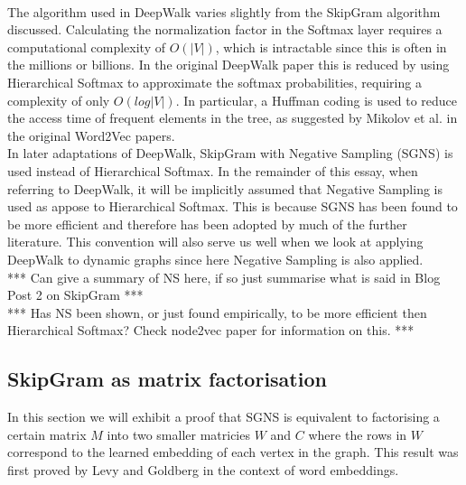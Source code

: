 \documentclass[a4paper]{article}
\begin{document}
\\
The algorithm used in DeepWalk varies slightly from the SkipGram algorithm
discussed. Calculating the normalization factor in the Softmax layer requires a
computational complexity of $O(|V|)$, which is intractable since this is often
in the millions or billions. In the original DeepWalk paper this is
reduced by using Hierarchical Softmax to approximate the softmax probabilities,
requiring a complexity of only $O(log|V|)$. In particular, a Huffman coding is
used to reduce the access time of frequent elements in the tree, as suggested by
Mikolov et al. in the original Word2Vec
papers.\cite{mikolov2013efficient,mikolov2013distributed}\\
In later adaptations of DeepWalk, SkipGram with Negative Sampling (SGNS) is used instead of
Hierarchical Softmax. In the remainder of this essay, when referring to DeepWalk, it will be
implicitly assumed that Negative Sampling is used as appose to Hierarchical
Softmax. This is because SGNS has been found to be more efficient
and therefore has been adopted by much of the further literature. This convention will also
serve us well when we look at applying DeepWalk to dynamic graphs since here
Negative Sampling is also applied.\\
*** Can give a summary of NS here, if so just summarise what is said in Blog
Post 2 on SkipGram ***\\
*** Has NS been shown, or just found empirically, to be more efficient then
Hierarchical Softmax? Check node2vec paper for information on this. ***\\
\subsection{SkipGram as matrix factorisation}
In this section we will exhibit a proof that SGNS is
equivalent to factorising a certain matrix $M$ into two smaller matricies $W$
and $C$ where the rows in $W$ correspond to the learned embedding of each vertex
in the graph. This result was first proved by Levy and
Goldberg\cite{levy&goldberg} in the context of word embeddings.\\
\end{document}
